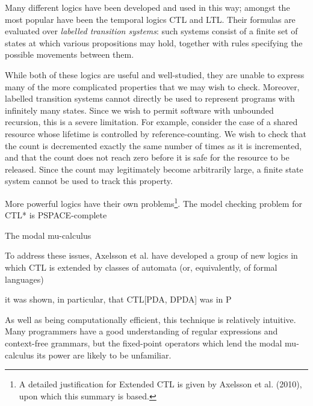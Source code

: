 \documentclass[11pt]{article}
\theoremstyle{definition}
\begin{document}
Many different logics have been developed and used in this way; amongst the
most popular have been the temporal logics CTL and LTL. Their formulas are
evaluated over \textit{labelled transition systems}: such systems consist of a
finite set of states at which various propositions may hold, together with
rules specifying the possible movements between them. %

While both of these logics are useful and well-studied, they are unable to
express many of the more complicated properties that we may wish to check.
Moreover, labelled transition systems cannot directly be used to represent
programs with infinitely many states. Since we wish to permit software with
unbounded recursion, this is a severe limitation. For example, consider the
case of a shared resource whose lifetime is controlled by reference-counting.
We wish to check that the count is decremented exactly the same number of times
as it is incremented, and that the count does not reach zero before it is safe
for the resource to be released. Since the count may legitimately become
arbitrarily large, a finite state system cannot be used to track this property.


More powerful logics have their own problems\footnote{A detailed justification
for Extended CTL is given by Axelsson et al. (2010), upon which this summary is
based.}. The model checking problem for CTL* is
PSPACE-complete\cite{Kreutzer10}\cite{sistla1985complexity}

The modal mu-calculus   %


To address these issues, Axelsson et al. have developed a group of new logics 
in which CTL is extended by classes of automata (or, equivalently, of formal languages)

it was shown, in particular, that CTL[PDA, DPDA] was in P


As well as being computationally efficient, this technique is relatively
intuitive. Many programmers have a good understanding of regular expressions
and context-free grammars, but the fixed-point operators which lend the modal
mu-calculus its power are likely to be unfamiliar.

\end{document}
